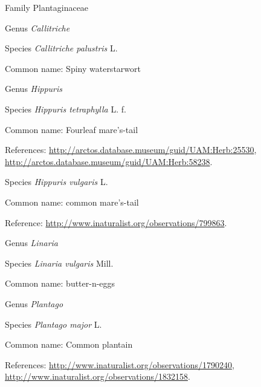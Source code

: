 \documentclass[9pt, article]{memoir}
\begin{document}
\begin{multicols}{2}
\vspace{6pt}\noindent\hspace{24pt}Family Plantaginaceae


\vspace{6pt}\noindent\hspace{30pt}Genus \textit{Callitriche}


\vspace{6pt}\noindent\hspace{36pt}Species \textit{Callitriche palustris} L.


Common name: Spiny waterstarwort

\vspace{6pt}\noindent\hspace{30pt}Genus \textit{Hippuris}


\vspace{6pt}\noindent\hspace{36pt}Species \textit{Hippuris tetraphylla} L. f.


Common name: Fourleaf mare's-tail

References: 
\url{http://arctos.database.museum/guid/UAM:Herb:25530}, 
\url{http://arctos.database.museum/guid/UAM:Herb:58238}.

\vspace{6pt}\noindent\hspace{36pt}Species \textit{Hippuris vulgaris} L.


Common name: common mare's-tail

Reference: 
\url{http://www.inaturalist.org/observations/799863}.

\vspace{6pt}\noindent\hspace{30pt}Genus \textit{Linaria}


\vspace{6pt}\noindent\hspace{36pt}Species \textit{Linaria vulgaris} Mill.


Common name: butter-n-eggs

\vspace{6pt}\noindent\hspace{30pt}Genus \textit{Plantago}


\vspace{6pt}\noindent\hspace{36pt}Species \textit{Plantago major} L.


Common name: Common plantain

References: 
\url{http://www.inaturalist.org/observations/1790240}, 
\url{http://www.inaturalist.org/observations/1832158}.


\end{multicols}
\end{document}
